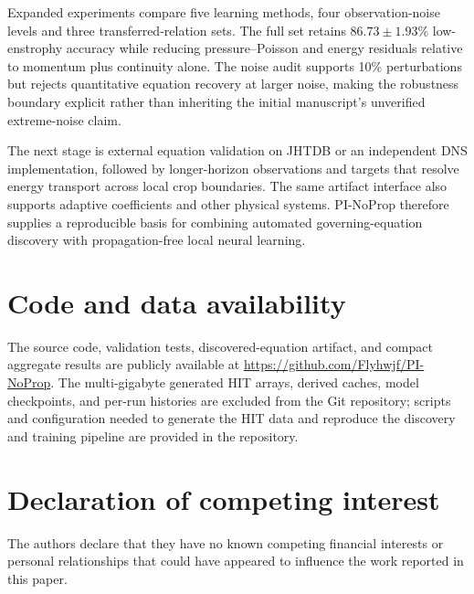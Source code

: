 \documentclass[preprint,12pt]{elsarticle}
\begin{document}
Expanded experiments compare five learning methods, four observation-noise
levels and three transferred-relation sets. The full set retains
$86.73\pm1.93\%$ low-enstrophy accuracy while reducing pressure--Poisson and
energy residuals relative to momentum plus continuity alone. The noise audit supports
10\% perturbations but rejects quantitative equation recovery at larger noise,
making the robustness boundary explicit rather than inheriting the initial
manuscript's unverified extreme-noise claim.

The next stage is external equation validation on JHTDB or an independent DNS
implementation, followed by longer-horizon observations and targets that
resolve energy transport across local crop boundaries. The same artifact
interface also supports adaptive coefficients and other physical systems.
PI-NoProp therefore supplies a reproducible basis for combining automated
governing-equation discovery with propagation-free local neural learning.


\section*{Code and data availability}
The source code, validation tests, discovered-equation artifact, and compact
aggregate results are publicly available at
\url{https://github.com/Flyhwjf/PI-NoProp}. The multi-gigabyte generated HIT
arrays, derived caches, model checkpoints, and per-run histories are excluded
from the Git repository; scripts and configuration needed to generate the HIT
data and reproduce the discovery and training pipeline are provided in the
repository.


\section*{Declaration of competing interest}
The authors declare that they have no known competing financial interests or personal relationships that could have appeared to influence the work reported in this paper.

% 
%
\end{document}
